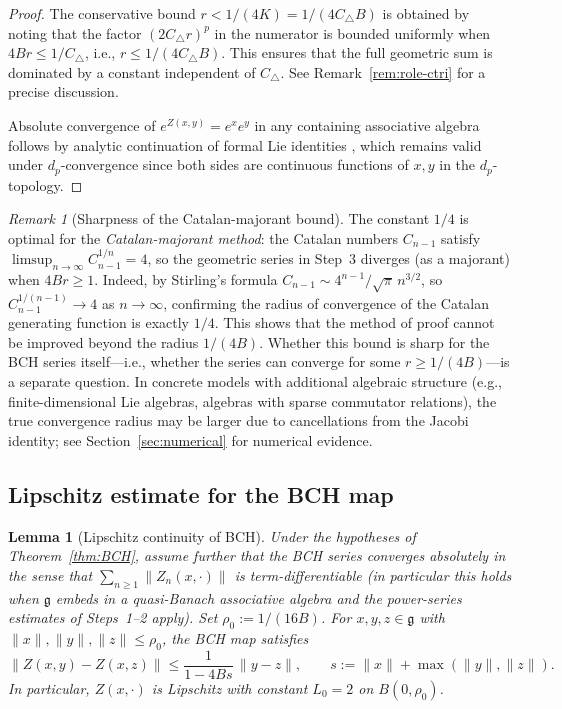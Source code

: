 \documentclass[10pt]{amsart}
\newtheorem{lemma}[theorem]{Lemma}
\theoremstyle{definition}
\theoremstyle{remark}
\newtheorem{remark}[theorem]{Remark}
\numberwithin{equation}{section}
\newcommand{\Ctri}{C_{\triangle}}    %
\newcommand{\Cbracket}{B}            %
\newcommand{\Ctotal}{K}              %
\begin{document}
\begin{proof}
\smallskip
The conservative bound $r < 1/(4\Ctotal) = 1/(4\Ctri\Cbracket)$ is obtained by noting
that the factor $(2\Ctri r)^p$ in the numerator is bounded uniformly when
$4\Cbracket r \le 1/\Ctri$, i.e., $r \le 1/(4\Ctri\Cbracket)$.  This ensures that the
full geometric sum is dominated by a constant independent of $\Ctri$.  See
Remark~\ref{rem:role-ctri} for a precise discussion.

Absolute convergence of $e^{Z(x,y)}=e^x e^y$ in any containing associative algebra
follows by analytic continuation of formal Lie identities
\cite[Ch.~II, \S6, Prop.~8]{Bourbaki1989}, which remains valid under $d_p$-convergence
since both sides are continuous functions of $x,y$ in the $d_p$-topology.
\end{proof}

\begin{remark}[Sharpness of the Catalan-majorant bound]\label{rem:sharpness}
The constant $1/4$ is optimal for the \emph{Catalan-majorant method}: the Catalan numbers
$C_{n-1}$ satisfy $\limsup_{n\to\infty} C_{n-1}^{1/n} = 4$, so the geometric series in
Step~3 diverges (as a majorant) when $4\Cbracket r \ge 1$.  Indeed, by Stirling's formula
$C_{n-1} \sim 4^{n-1}/\sqrt{\pi}\,n^{3/2}$, so $C_{n-1}^{1/(n-1)} \to 4$ as $n \to \infty$,
confirming the radius of convergence of the Catalan generating function is exactly $1/4$.
This shows that the method of proof cannot be improved beyond the radius $1/(4\Cbracket)$.
Whether this bound is sharp for the BCH series itself---i.e., whether the series can
converge for some $r \ge 1/(4\Cbracket)$---is a separate question.  In concrete models
with additional algebraic structure (e.g., finite-dimensional Lie algebras, algebras with
sparse commutator relations), the true convergence radius may be larger due to
cancellations from the Jacobi identity; see Section~\ref{sec:numerical} for numerical
evidence.
\end{remark}

\subsection{Lipschitz estimate for the BCH map}
\label{subsec:bch-lipschitz}

\begin{lemma}[Lipschitz continuity of BCH]\label{lem:bch-lipschitz}
Under the hypotheses of Theorem~\ref{thm:BCH}, assume further that the BCH series
converges absolutely in the sense that $\sum_{n \ge 1} \|Z_n(x,\cdot)\|$ is
term-differentiable (in particular this holds when $\mathfrak{g}$ embeds in a quasi-Banach
associative algebra and the power-series estimates of Steps~1--2 apply).
Set $\rho_0 := 1/(16\Cbracket)$.
For $x, y, z \in \mathfrak{g}$ with $\|x\|,\|y\|,\|z\| \le \rho_0$, the
BCH map satisfies
\[
  \|Z(x,y) - Z(x,z)\| \le \frac{1}{1 - 4\Cbracket s}\,\|y - z\|,
  \qquad s := \|x\| + \max(\|y\|,\|z\|).
\]
In particular, $Z(x,\cdot)$ is Lipschitz with constant $L_0 = 2$ on $B(0,\rho_0)$.
\end{lemma}
\end{document}
